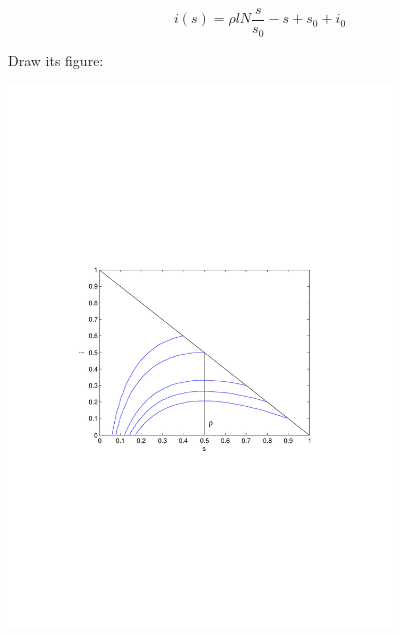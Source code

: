 \begin{equation}
i(s)=\rho lN\frac{s}{s_0}-s+s_0+i_0
\label{equ:10}
\end{equation}

Draw its figure:\par
\begin{center}
\includegraphics[width=4in]{imgs/i(s)_i_s.pdf}
\end{center}

